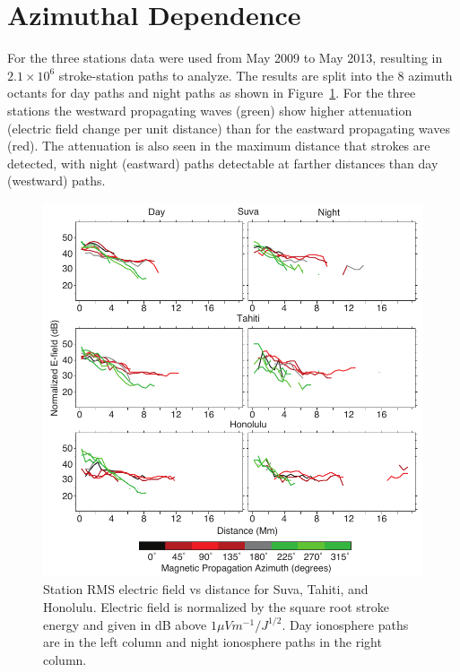 \section{Azimuthal Dependence}

For the three stations data were used from May 2009 to May 2013, resulting in $2.1\times10^6$ stroke-station paths to analyze.
The results are split into the 8 azimuth octants for day paths and night paths as shown in Figure~\ref{azimuth:fig:azimuth}.
For the three stations the westward propagating waves (green) show higher attenuation (electric field change per unit distance) than for the eastward propagating waves (red).
The attenuation is also seen in the maximum distance that strokes are detected, with night (eastward) paths detectable at farther distances than day (westward) paths.

 \begin{figure}[h!t]
   \centering
   \includegraphics[scale=1]{Azimuth/Figures/e-field_3.pdf} 
   \caption{Station RMS electric field vs distance for Suva, Tahiti, and Honolulu.
   	Electric field is normalized by the square root stroke energy and given in dB above $1 \mu Vm^{-1}/J^{1/2}$.
	Day ionosphere paths are in the left column and night ionosphere paths in the right column.}
   \label{azimuth:fig:azimuth}
\end{figure}

